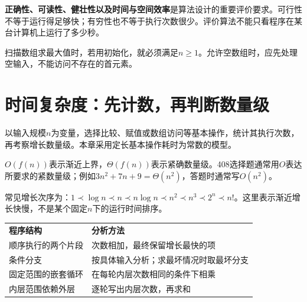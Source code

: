 \hypertarget{ds1-output}{}


\hypertarget{ds1-quality}{}

\textbf{正确性、可读性、健壮性以及时间与空间效率}是算法设计的重要评价要求。可行性不等于运行得足够快；有穷性也不等于执行次数很少。评价算法不能只看程序在某台计算机上运行了多少秒。


\hypertarget{ds1-max-boundary}{}

\begin{example}
扫描数组求最大值时，若用初始化，就必须满足$n\ge1$。允许空数组时，应先处理空输入，不能访问不存在的首元素。
\end{example}

\hypertarget{ds1-time}{}

\section{时间复杂度：先计数，再判断数量级}\label{ds1-time}

\hypertarget{ds1-cost}{}

以输入规模$n$为变量，选择比较、赋值或数组访问等基本操作，统计其执行次数，再考察增长数量级。本章采用定长基本操作耗时为常数的模型。


\hypertarget{ds1-asymptotic}{}

\begin{takeaway}[记号与化简]
$O(f(n))$表示渐近上界，$\Theta(f(n))$表示紧确数量级。408选择题通常用$O$表达所要求的紧数量级；例如$3n^2+7n+9=\Theta(n^2)$，答题时通常写$O(n^2)$。
\end{takeaway}

\hypertarget{ds1-order}{}

常见增长次序为：$1\prec\log n\prec n\prec n\log n\prec n^2\prec n^3\prec2^n\prec n!$。这里表示渐近增长快慢，不是某个固定$n$下的运行时间排序。


\hypertarget{ds1-rules}{}

\par\smallskip\noindent\begin{tabularx}{\linewidth}{@{}YY@{}}\toprule
{} \textbf{程序结构} & \textbf{分析方法} \\
顺序执行的两个片段 & 次数相加，最终保留增长最快的项 \\
条件分支 & 按具体输入分析；求最坏情况时取最坏分支 \\
固定范围的嵌套循环 & 在每轮内层次数相同的条件下相乘 \\
内层范围依赖外层 & 逐轮写出内层次数，再求和 \\\bottomrule\end{tabularx}\par\smallskip

